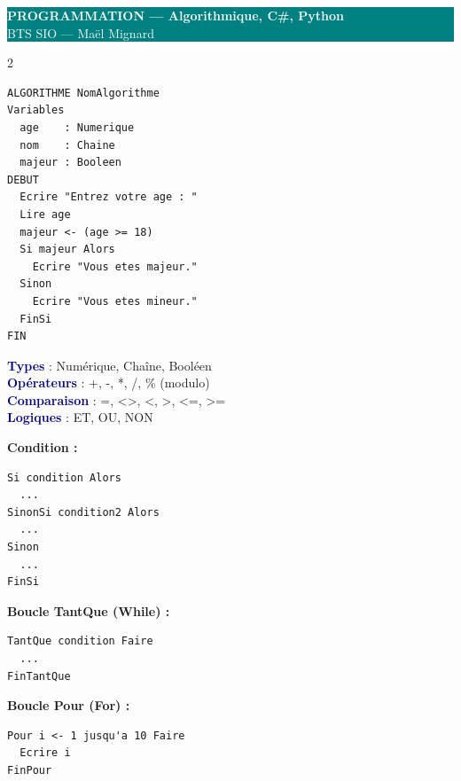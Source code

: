 \documentclass[a4paper,10pt]{article}
\newcommand{\key}[1]{\textbf{\textcolor{navy}{#1}}}
\begin{document}
\begin{center}
  \colorbox{teal}{\parbox{\dimexpr\textwidth-2\fboxsep}{
    \centering\vspace{3pt}
    {\LARGE\bfseries\textcolor{white}{PROGRAMMATION — Algorithmique, C\#, Python}}\\
    {\normalsize\textcolor{white}{BTS SIO — Maël Mignard}}
    \vspace{3pt}
  }}
\end{center}
\vspace{6pt}

\begin{multicols}{2}

\begin{tcolorbox}[basebox, colframe=navy, title=1. Algorithmique — Structure générale]
\begin{lstlisting}[style=algo]
ALGORITHME NomAlgorithme
Variables
  age    : Numerique
  nom    : Chaine
  majeur : Booleen
DEBUT
  Ecrire "Entrez votre age : "
  Lire age
  majeur <- (age >= 18)
  Si majeur Alors
    Ecrire "Vous etes majeur."
  Sinon
    Ecrire "Vous etes mineur."
  FinSi
FIN
\end{lstlisting}
\key{Types} : Numérique, Chaîne, Booléen \\
\key{Opérateurs} : +, -, *, /, \% (modulo) \\
\key{Comparaison} : =, <>, <, >, <=, >= \\
\key{Logiques} : ET, OU, NON
\end{tcolorbox}

\begin{tcolorbox}[basebox, colframe=teal, title=2. Algorithmique — Structures de contrôle]
\textbf{Condition :}
\begin{lstlisting}[style=algo]
Si condition Alors
  ...
SinonSi condition2 Alors
  ...
Sinon
  ...
FinSi
\end{lstlisting}
\vspace{4pt}
\textbf{Boucle TantQue (While) :}
\begin{lstlisting}[style=algo]
TantQue condition Faire
  ...
FinTantQue
\end{lstlisting}
\vspace{4pt}
\textbf{Boucle Pour (For) :}
\begin{lstlisting}[style=algo]
Pour i <- 1 jusqu'a 10 Faire
  Ecrire i
FinPour
\end{lstlisting}
\end{tcolorbox}


\end{multicols}
\end{document}
